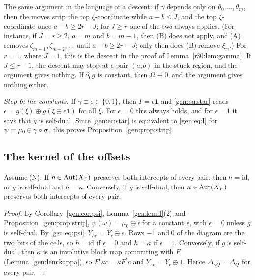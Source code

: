 The same argument in the language of a descent: if $\gamma$ depends only on $\theta_0,\dots,\theta_m$, then the moves strip the top $\zeta$-coordinate while $a-b\le J$, and the top $\xi$-coordinate once $a-b\ge2r-J$; for $J\ge r$ one of the two always applies. (For instance, if $J=r\ge2$, $a=m$ and $b=m-1$, then (B) does not apply, and (A) removes $\zeta_{m-1},\zeta_{m-2},\dots$ until $a-b\ge2r-J$; only then does (B) remove $\xi_m$.) For $r=1$, where $J=1$, this is the descent in the proof of Lemma~\ref{r30:lem:gamma}. If $J\le r-1$, the descent may stop at a pair $(a,b)$ in the stuck region, and the argument gives nothing. If $\partial_0g$ is constant, then $\Omega\equiv0$, and the argument gives nothing either.

\emph{Step 6: the constants.} If $\gamma\equiv\epsilon\in\{0,1\}$, then $\Gamma=\epsilon\mathbf 1$ and \eqref{gen:eq:star} reads $\epsilon=g(\xi)\oplus g(\xi\oplus\epsilon\mathbf 1)$ for all $\xi$. For $\epsilon=0$ this always holds, and for $\epsilon=1$ it says that $g$ is self-dual. Since \eqref{gen:eq:star} is equivalent to \eqref{gen:eq:I} for $\psi=\mu_0\oplus\gamma\circ\sigma$, this proves Proposition~\ref{gen:prop:strip}.

\subsection{The kernel of the offsets}\label{gen:sec:kernel}

\begin{proposition}\label{gen:prop:kernel}
Assume \textup{(N)}. If $h\in\operatorname{Aut}(X_F)$ preserves both intercepts of every pair, then $h=\mathrm{id}$, or $g$ is self-dual and $h=\kappa$. Conversely, if $g$ is self-dual, then $\kappa\in\operatorname{Aut}(X_F)$ preserves both intercepts of every pair.
\end{proposition}

\begin{proof}
By Corollary~\ref{gen:cor:psi}, Lemma~\ref{gen:lem:I}(2) and Proposition~\ref{gen:prop:strip}, $\psi(\omega)=\mu_0\oplus\epsilon$ for a constant $\epsilon$, with $\epsilon=0$ unless $g$ is self-dual. By \eqref{gen:eq:psi}, $Y_{hc}=Y_c\oplus\epsilon$. Rows $-1$ and $0$ of the diagram are the two bits of the cells, so $h=\mathrm{id}$ if $\epsilon=0$ and $h=\kappa$ if $\epsilon=1$. Conversely, if $g$ is self-dual, then $\kappa$ is an involutive block map commuting with $F$ (Lemma~\ref{gen:lem:kappa}), so $F^t\kappa c=\kappa F^tc$ and $Y_{\kappa c}=Y_c\oplus1$. Hence $\Delta_{\kappa Q}=\Delta_Q$ for every pair.
\end{proof}

